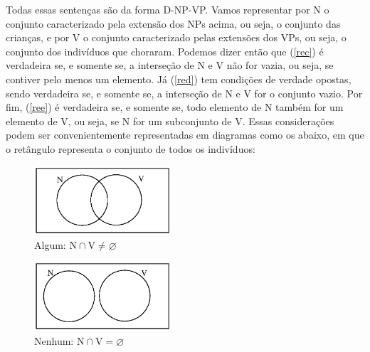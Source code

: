 \n Todas essas sentenças são da forma D-NP-VP. Vamos representar
por N o conjunto caracterizado pela extensão dos NPs acima, ou seja, o conjunto das
crianças, e por V o conjunto caracterizado pelas extensões dos VPs, ou seja, o
conjunto dos indivíduos que choraram. Podemos dizer então que
(\ref{rec}) é verdadeira se, e somente se, a interseção de N e V
não for vazia, ou seja, se contiver pelo menos um elemento. Já
(\ref{red}) tem condições de verdade opostas, sendo verdadeira
se, e somente se, a interseção de N e V for o conjunto vazio. Por
fim, (\ref{ree}) é verdadeira se, e somente se, todo elemento de N
também for um elemento de V, ou seja, se N for um subconjunto de
V. Essas considerações podem ser convenientemente representadas em
diagramas como os abaixo, em que o retângulo representa o conjunto
de todos os indivíduos:

\begin{figure}[H]
\centerline{\includegraphics[width=12pc]{figures/algum.eps}}
\caption{Algum: $\text{N}\cap\text{V}\neq\varnothing$}
\end{figure}

\begin{figure}[H]
\centerline{\includegraphics[width=12pc]{figures/nenhum.eps}}
\caption{Nenhum: $\text{N}\cap\text{V}=\varnothing$}
\end{figure}


